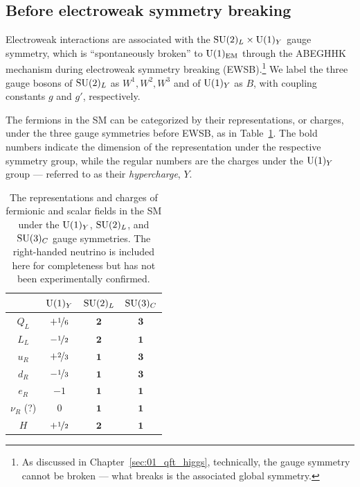 \subsection{Before electroweak symmetry breaking}

Electroweak interactions are associated with the $\SU[2]_L \times \UU[1]_Y$ gauge symmetry, which is ``spontaneously broken'' to $\UU[1]_{\text{EM}}$ through the ABEGHHK mechanism during electroweak symmetry breaking (EWSB).\footnote{As discussed in Chapter~\ref{sec:01_qft_higgs}, technically, the gauge symmetry cannot be broken --- what breaks is the associated global symmetry.}
We label the three gauge bosons of $\SU[2]_L$ as $W^1, W^2, W^3$ and of $\UU[1]_Y$ as $B$, with coupling constants $g$ and $g'$, respectively.

The fermions in the SM can be categorized by their representations, or charges, under the three gauge symmetries before EWSB, as in Table~\ref{tab:01_sm_ew_fermions}.
The bold numbers indicate the dimension of the representation under the respective symmetry group, while the regular numbers are the charges under the $\UU[1]_Y$ group --- referred to as their \textit{hypercharge}, $Y$.

\begin{table}[ht]
	\renewcommand{\arraystretch}{1.5}
	\centering
	\begin{tabular}{c|ccc}
		 & $\UU[1]_Y$ & $\SU[2]_L$ & $\SU[3]_C$ \\
		\midrule
		$Q_L$ & $+ \nicefrac{1}{6}$ & $\mathbf{2}$ & $\mathbf{3}$ \\
		$L_L$ & $- \nicefrac{1}{2}$ & $\mathbf{2}$ & $\mathbf{1}$ \\
		$u_R$ & $+ \nicefrac{2}{3}$ & $\mathbf{1}$ & $\mathbf{3}$ \\
		$d_R$ & $- \nicefrac{1}{3}$ & $\mathbf{1}$ & $\mathbf{3}$ \\
		$e_R$ & $-1$ & $\mathbf{1}$ & $\mathbf{1}$ \\
		$\nu_R$ (?) & $0$ & $\mathbf{1}$ & $\mathbf{1}$ \\
		$H$ & $+ \nicefrac{1}{2}$ & $\mathbf{2}$ & $\mathbf{1}$ \\
	\end{tabular}
	\vspace{2mm}
	\caption{The representations and charges of fermionic and scalar fields in the SM under the $\UU[1]_Y$, $\SU[2]_L$, and $\SU[3]_C$ gauge symmetries. 
	The right-handed neutrino is included here for completeness but has not been experimentally confirmed.}
	\label{tab:01_sm_ew_fermions}
\end{table}

